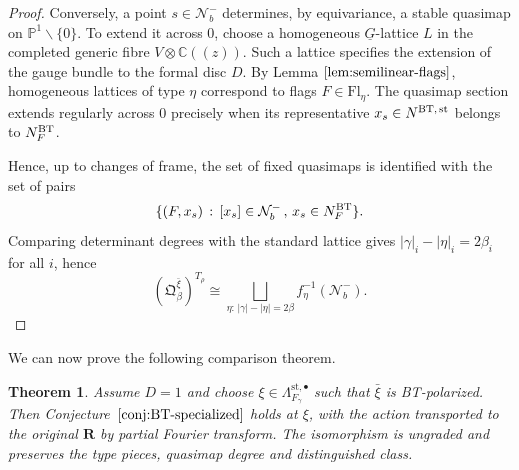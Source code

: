 \documentclass[11pt,reqno]{amsart}
\newtheorem{Theorem}{Theorem}[section]
\theoremstyle{definition}
\theoremstyle{remark}
\def\dG{\underline G}
\def\calN{\mathcal N}
\def\Fl{\mathrm{Fl}}
\def\bR{\mathbf R}
\newcommand{\llp}{(\!(}
\newcommand{\rrp}{)\!)}
\begin{document}
\begin{proof}
Conversely, a point \(s\in\mathcal N_b^-\) determines, by equivariance, a stable quasimap on \(\mathbb P^1\smallsetminus\{0\}\). 
To extend it across \(0\), choose a homogeneous \(\dG\)-lattice \(L\) in the completed generic fibre \(V\otimes\mathbb C\llp z\rrp\). 
Such a lattice specifies the extension of the gauge bundle to the formal disc \(D\). By Lemma \(\ref{lem:semilinear-flags}\), 
homogeneous lattices of type \(\eta\) correspond to flags \(F\in\Fl_\eta\). 
The quasimap section extends regularly across $0$ precisely when
its representative $x_s\in N^{\rm BT,\, st}$ belongs to $N_F^{\rm BT}$.

Hence, up to changes of frame, the set of fixed quasimaps is identified with the set of pairs
$$\{(F,x_s)\,:\,[x_s]\in \calN_b^-\,,\,x_s\in N^{\rm BT}_F\}.$$
Comparing determinant degrees with the standard lattice gives
$|\gamma|_i-|\eta|_i=2\beta_i$ for all $i$, hence
\[
 (\mathfrak Q_\beta^{\bar\xi})^{T_\rho}
 \cong\bigsqcup_{\eta:\,|\gamma|-|\eta|=2\beta} f_\eta^{-1}(\calN_b^-).
\]
\end{proof}

We can now prove the following comparison theorem.

\begin{Theorem}\label{thm:BT-polarized}
Assume $D=1$ and choose
$\xi\in\Lambda_{F_\gamma}^{\mathrm{st},\bullet}$ such that
$\bar\xi$ is BT-polarized. Then Conjecture~$\ref{conj:BT-specialized}$
holds at $\xi$, with the action transported to the original $\bR$
by partial Fourier transform. The isomorphism is ungraded and
preserves the type pieces, quasimap degree and distinguished class.
\end{Theorem}
\end{document}

